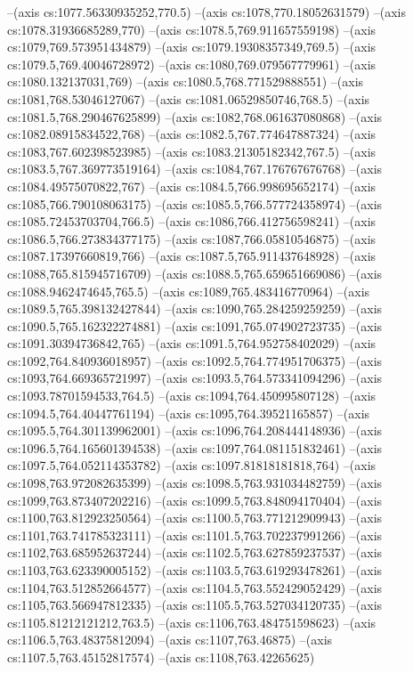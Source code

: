 --(axis cs:1077.56330935252,770.5)
--(axis cs:1078,770.18052631579)
--(axis cs:1078.31936685289,770)
--(axis cs:1078.5,769.911657559198)
--(axis cs:1079,769.573951434879)
--(axis cs:1079.19308357349,769.5)
--(axis cs:1079.5,769.40046728972)
--(axis cs:1080,769.079567779961)
--(axis cs:1080.132137031,769)
--(axis cs:1080.5,768.771529888551)
--(axis cs:1081,768.53046127067)
--(axis cs:1081.06529850746,768.5)
--(axis cs:1081.5,768.290467625899)
--(axis cs:1082,768.061637080868)
--(axis cs:1082.08915834522,768)
--(axis cs:1082.5,767.774647887324)
--(axis cs:1083,767.602398523985)
--(axis cs:1083.21305182342,767.5)
--(axis cs:1083.5,767.369773519164)
--(axis cs:1084,767.176767676768)
--(axis cs:1084.49575070822,767)
--(axis cs:1084.5,766.998695652174)
--(axis cs:1085,766.790108063175)
--(axis cs:1085.5,766.577724358974)
--(axis cs:1085.72453703704,766.5)
--(axis cs:1086,766.412756598241)
--(axis cs:1086.5,766.273834377175)
--(axis cs:1087,766.05810546875)
--(axis cs:1087.17397660819,766)
--(axis cs:1087.5,765.911437648928)
--(axis cs:1088,765.815945716709)
--(axis cs:1088.5,765.659651669086)
--(axis cs:1088.9462474645,765.5)
--(axis cs:1089,765.483416770964)
--(axis cs:1089.5,765.398132427844)
--(axis cs:1090,765.284259259259)
--(axis cs:1090.5,765.162322274881)
--(axis cs:1091,765.074902723735)
--(axis cs:1091.30394736842,765)
--(axis cs:1091.5,764.952758402029)
--(axis cs:1092,764.840936018957)
--(axis cs:1092.5,764.774951706375)
--(axis cs:1093,764.669365721997)
--(axis cs:1093.5,764.573341094296)
--(axis cs:1093.78701594533,764.5)
--(axis cs:1094,764.450995807128)
--(axis cs:1094.5,764.40447761194)
--(axis cs:1095,764.39521165857)
--(axis cs:1095.5,764.301139962001)
--(axis cs:1096,764.208444148936)
--(axis cs:1096.5,764.165601394538)
--(axis cs:1097,764.081151832461)
--(axis cs:1097.5,764.052114353782)
--(axis cs:1097.81818181818,764)
--(axis cs:1098,763.972082635399)
--(axis cs:1098.5,763.931034482759)
--(axis cs:1099,763.873407202216)
--(axis cs:1099.5,763.848094170404)
--(axis cs:1100,763.812923250564)
--(axis cs:1100.5,763.771212909943)
--(axis cs:1101,763.741785323111)
--(axis cs:1101.5,763.702237991266)
--(axis cs:1102,763.685952637244)
--(axis cs:1102.5,763.627859237537)
--(axis cs:1103,763.623390005152)
--(axis cs:1103.5,763.619293478261)
--(axis cs:1104,763.512852664577)
--(axis cs:1104.5,763.552429052429)
--(axis cs:1105,763.566947812335)
--(axis cs:1105.5,763.527034120735)
--(axis cs:1105.81212121212,763.5)
--(axis cs:1106,763.484751598623)
--(axis cs:1106.5,763.48375812094)
--(axis cs:1107,763.46875)
--(axis cs:1107.5,763.45152817574)
--(axis cs:1108,763.42265625)
